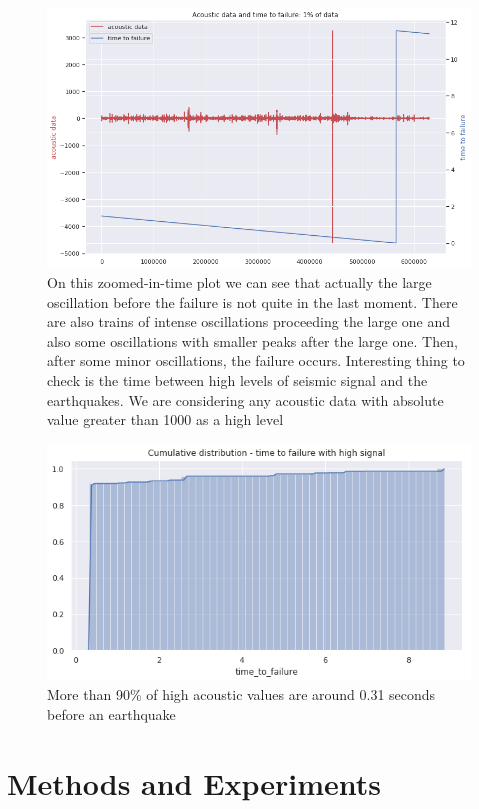\documentclass[]{llncs}
\begin{document}
\begin{figure}
	\centering
	\includegraphics[width=0.7\linewidth]{../GPUProject/zoomedInTimePlot}
	\caption{On this zoomed-in-time plot we can see that actually the large oscillation before the failure is not quite in the last moment. There are also trains of intense oscillations proceeding the large one and also some oscillations with smaller peaks after the large one. Then, after some minor oscillations, the failure occurs. Interesting thing to check is the time between high levels of seismic signal and the earthquakes. We are considering any acoustic data with absolute value greater than 1000 as a high level}
	\label{fig:zoomedintimeplot}
\end{figure}

\begin{figure}
	\centering
	\includegraphics[width=0.7\linewidth]{../GPUProject/moreThan90percent}
	\caption{More than 90\% of high acoustic values are around 0.31 seconds before an earthquake}
		\label{fig:morethan90percenta}
	\end{figure}

\section{Methods and Experiments}
\end{document}
